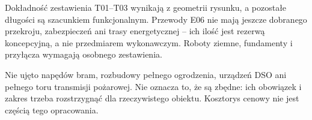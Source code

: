 \begin{note}{Dokładność zestawienia}
T01--T03 wynikają z geometrii rysunku, a pozostałe długości są szacunkiem funkcjonalnym. Przewody E06 nie mają jeszcze dobranego przekroju, zabezpieczeń ani trasy energetycznej -- ich ilość jest rezerwą koncepcyjną, a nie przedmiarem wykonawczym. Roboty ziemne, fundamenty i przyłącza wymagają osobnego zestawienia.
\end{note}
Nie ujęto napędów bram, rozbudowy pełnego ogrodzenia, urządzeń DSO ani pełnego toru transmisji pożarowej. Nie oznacza to, że są zbędne: ich obowiązek i zakres trzeba rozstrzygnąć dla rzeczywistego obiektu. Kosztorys cenowy nie jest częścią tego opracowania.
